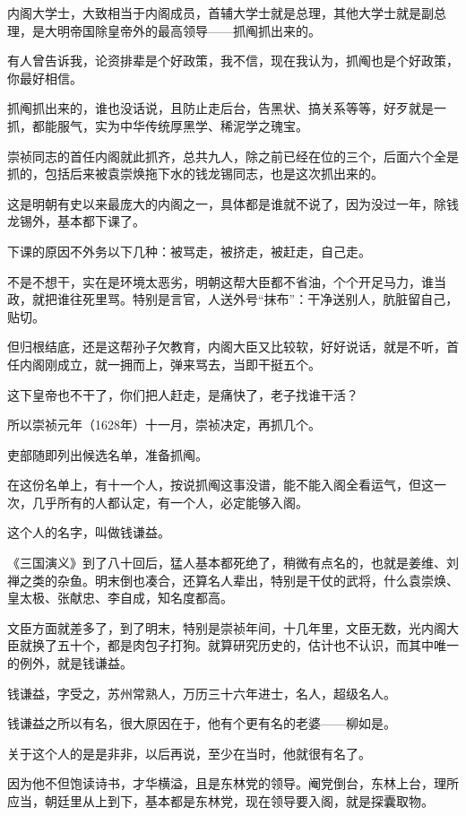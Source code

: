 \begin{multicols}{\theparacolNo}
		内阁大学士，大致相当于内阁成员，首辅大学士就是总理，其他大学士就是副总理，是大明帝国除皇帝外的最高领导——抓阄抓出来的。

		有人曾告诉我，论资排辈是个好政策，我不信，现在我认为，抓阄也是个好政策，你最好相信。

		抓阄抓出来的，谁也没话说，且防止走后台，告黑状、搞关系等等，好歹就是一抓，都能服气，实为中华传统厚黑学、稀泥学之瑰宝。

		崇祯同志的首任内阁就此抓齐，总共九人，除之前已经在位的三个，后面六个全是抓的，包括后来被袁崇焕拖下水的钱龙锡同志，也是这次抓出来的。

		这是明朝有史以来最庞大的内阁之一，具体都是谁就不说了，因为没过一年，除钱龙锡外，基本都下课了。

		下课的原因不外务以下几种：被骂走，被挤走，被赶走，自己走。

		不是不想干，实在是环境太恶劣，明朝这帮大臣都不省油，个个开足马力，谁当政，就把谁往死里骂。特别是言官，人送外号“抹布”：干净送别人，肮脏留自己，贴切。

		但归根结底，还是这帮孙子欠教育，内阁大臣又比较软，好好说话，就是不听，首任内阁刚成立，就一拥而上，弹来骂去，当即干挺五个。

		这下皇帝也不干了，你们把人赶走，是痛快了，老子找谁干活？

		所以崇祯元年（1628年）十一月，崇祯决定，再抓几个。

		吏部随即列出候选名单，准备抓阄。

		在这份名单上，有十一个人，按说抓阄这事没谱，能不能入阁全看运气，但这一次，几乎所有的人都认定，有一个人，必定能够入阁。

		这个人的名字，叫做钱谦益。

		《三国演义》到了八十回后，猛人基本都死绝了，稍微有点名的，也就是姜维、刘禅之类的杂鱼。明末倒也凑合，还算名人辈出，特别是干仗的武将，什么袁崇焕、皇太极、张献忠、李自成，知名度都高。

		文臣方面就差多了，到了明末，特别是崇祯年间，十几年里，文臣无数，光内阁大臣就换了五十个，都是肉包子打狗。就算研究历史的，估计也不认识，而其中唯一的例外，就是钱谦益。

		钱谦益，字受之，苏州常熟人，万历三十六年进士，名人，超级名人。

		钱谦益之所以有名，很大原因在于，他有个更有名的老婆——柳如是。

		关于这个人的是是非非，以后再说，至少在当时，他就很有名了。

		因为他不但饱读诗书，才华横溢，且是东林党的领导。阉党倒台，东林上台，理所应当，朝廷里从上到下，基本都是东林党，现在领导要入阁，就是探囊取物。


\end{multicols}
